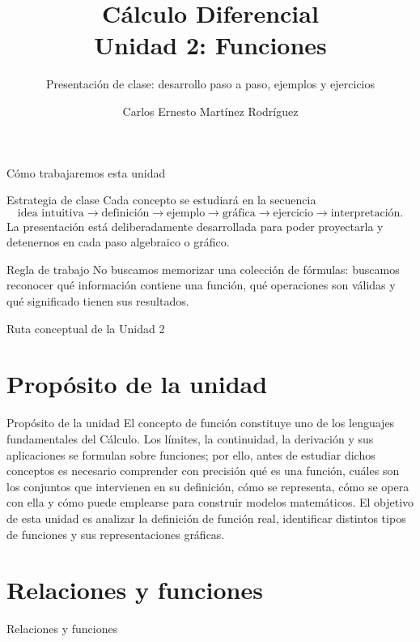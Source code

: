 \documentclass[aspectratio=169,10pt]{beamer}
\title{Cálculo Diferencial\\Unidad 2: Funciones}
\subtitle{Presentación de clase: desarrollo paso a paso, ejemplos y ejercicios}
\author{Carlos Ernesto Martínez Rodríguez}
\institute{Tecnológico Nacional de México}
\date{}
\begin{document}
\begin{frame}\titlepage\end{frame}
\begin{frame}{Cómo trabajaremos esta unidad}
\begin{block}{Estrategia de clase}
Cada concepto se estudiará en la secuencia
\[
\boxed{\text{idea intuitiva}\to\text{definición}\to\text{ejemplo}\to\text{gráfica}\to\text{ejercicio}\to\text{interpretación}.}
\]
La presentación está deliberadamente desarrollada para poder proyectarla y detenernos en cada paso algebraico o gráfico.
\end{block}
\begin{alertblock}{Regla de trabajo}
No buscamos memorizar una colección de fórmulas: buscamos reconocer qué información contiene una función, qué operaciones son válidas y qué significado tienen sus resultados.
\end{alertblock}
\end{frame}
\begin{frame}{Ruta conceptual de la Unidad 2}
\tableofcontents
\end{frame}
\section{Propósito de la unidad}
\begin{frame}{Propósito de la unidad}
El concepto de función constituye uno de los lenguajes fundamentales del Cálculo. Los límites, la continuidad, la derivación y sus aplicaciones se formulan sobre funciones; por ello, antes de estudiar dichos conceptos es necesario comprender con precisión qué es una función, cuáles son los conjuntos que intervienen en su definición, cómo se representa, cómo se opera con ella y cómo puede emplearse para construir modelos matemáticos. El objetivo de esta unidad es analizar la definición de función real, identificar distintos tipos de funciones y sus representaciones gráficas.

\end{frame}
\section{Relaciones y funciones}
\begin{frame}{Relaciones y funciones}


\end{frame}
\end{document}
